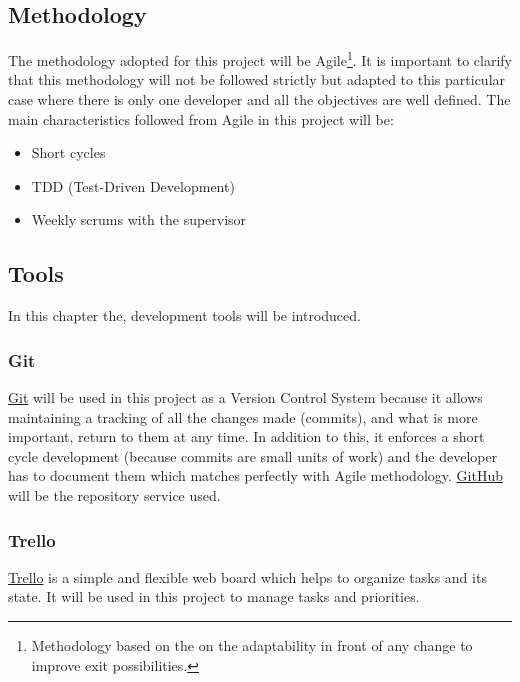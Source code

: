 \subsection{Methodology}
The methodology adopted for this project will be Agile\footnote{Methodology based on the on the adaptability in front of any change to improve exit possibilities.}. It is important to clarify that this methodology will not be followed strictly but adapted to this particular case where there is only one developer and all the objectives are well defined. The main characteristics followed from Agile in this project will be:
\begin{itemize}
	\item Short cycles
	\item TDD (Test-Driven Development)
	\item Weekly scrums with the supervisor
\end{itemize}

\subsection{Tools}
In this chapter the, development tools will be introduced. 
\subsubsection{Git}
\href{https://git-scm.com/}{Git} will be used in this project as a Version Control System because it allows maintaining a tracking of all the changes made (commits), and what is more important, return to them at any time. In addition to this, it enforces a short cycle development (because commits are small units of work) and the developer has to document them which matches perfectly with Agile methodology. \href{https://github.com}{GitHub} will be the repository service used.
\subsubsection{Trello}
\href{https://trello.com}{Trello} is a simple and flexible web board which helps to organize tasks and its state. It will be used in this project to manage tasks and priorities.  


